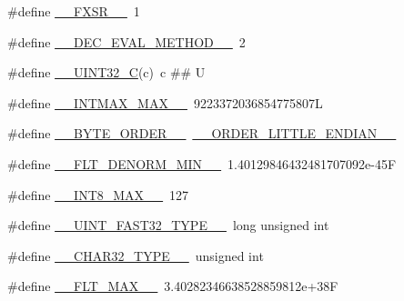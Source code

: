 \begin{DoxyCompactItemize}
\item 
\#define \hyperlink{build-analizer__host-_desktop___qt__5__9__0___g_c_c__64bit-debug_2moc__predefs_8h_a8d670e1ec8588185f0fb26433dc12ea1}{\+\_\+\+\_\+\+F\+X\+S\+R\+\_\+\+\_\+}~1
\item 
\#define \hyperlink{build-analizer__host-_desktop___qt__5__9__0___g_c_c__64bit-debug_2moc__predefs_8h_a53186c3d05006947fb8bd09bcdb0d60c}{\+\_\+\+\_\+\+D\+E\+C\+\_\+\+E\+V\+A\+L\+\_\+\+M\+E\+T\+H\+O\+D\+\_\+\+\_\+}~2
\item 
\#define \hyperlink{build-analizer__host-_desktop___qt__5__9__0___g_c_c__64bit-debug_2moc__predefs_8h_a8cc5a4a43af8f7568a450cad0e7d5bd8}{\+\_\+\+\_\+\+U\+I\+N\+T32\+\_\+\+C}(c)~c \#\# U
\item 
\#define \hyperlink{build-analizer__host-_desktop___qt__5__9__0___g_c_c__64bit-debug_2moc__predefs_8h_a6977858c9aa6bb2c67f524a948fc8062}{\+\_\+\+\_\+\+I\+N\+T\+M\+A\+X\+\_\+\+M\+A\+X\+\_\+\+\_\+}~9223372036854775807\+L
\item 
\#define \hyperlink{build-analizer__host-_desktop___qt__5__9__0___g_c_c__64bit-debug_2moc__predefs_8h_a02481ce2087724d8a2fb2322dbc549da}{\+\_\+\+\_\+\+B\+Y\+T\+E\+\_\+\+O\+R\+D\+E\+R\+\_\+\+\_\+}~\hyperlink{build-analizer__host-_desktop___qt__5__9__0___g_c_c__64bit-_release_2moc__predefs_8h_a2b695357ce4b46971d54e8e9dfe5724f}{\+\_\+\+\_\+\+O\+R\+D\+E\+R\+\_\+\+L\+I\+T\+T\+L\+E\+\_\+\+E\+N\+D\+I\+A\+N\+\_\+\+\_\+}
\item 
\#define \hyperlink{build-analizer__host-_desktop___qt__5__9__0___g_c_c__64bit-debug_2moc__predefs_8h_a20b8951342fd8b8af91e2bc9b34eb929}{\+\_\+\+\_\+\+F\+L\+T\+\_\+\+D\+E\+N\+O\+R\+M\+\_\+\+M\+I\+N\+\_\+\+\_\+}~1.\+40129846432481707092e-\/45\+F
\item 
\#define \hyperlink{build-analizer__host-_desktop___qt__5__9__0___g_c_c__64bit-debug_2moc__predefs_8h_a326c37ba86474b37dd0ae9100e005fac}{\+\_\+\+\_\+\+I\+N\+T8\+\_\+\+M\+A\+X\+\_\+\+\_\+}~127
\item 
\#define \hyperlink{build-analizer__host-_desktop___qt__5__9__0___g_c_c__64bit-debug_2moc__predefs_8h_a0746bdc61f4500f26c2b7408814ebfcf}{\+\_\+\+\_\+\+U\+I\+N\+T\+\_\+\+F\+A\+S\+T32\+\_\+\+T\+Y\+P\+E\+\_\+\+\_\+}~long unsigned int
\item 
\#define \hyperlink{build-analizer__host-_desktop___qt__5__9__0___g_c_c__64bit-debug_2moc__predefs_8h_acd1e46c682808f15749b16266ade0c27}{\+\_\+\+\_\+\+C\+H\+A\+R32\+\_\+\+T\+Y\+P\+E\+\_\+\+\_\+}~unsigned int
\item 
\#define \hyperlink{build-analizer__host-_desktop___qt__5__9__0___g_c_c__64bit-debug_2moc__predefs_8h_aa26975016847959a13829cb568b126b3}{\+\_\+\+\_\+\+F\+L\+T\+\_\+\+M\+A\+X\+\_\+\+\_\+}~3.\+40282346638528859812e+38\+F

\end{DoxyCompactItemize}
